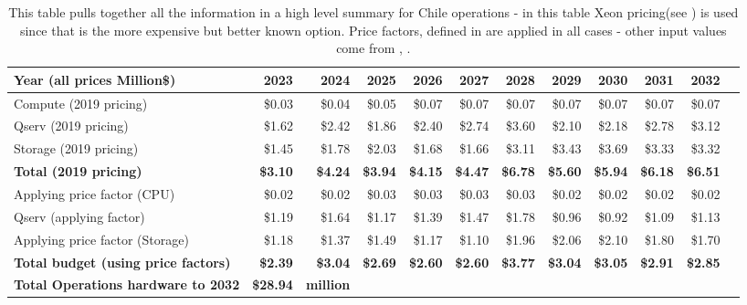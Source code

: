 \tiny \begin{longtable} { |p{}  |r  |r  |r  |r  |r  |r  |r  |r  |r  |r  |r |} 
\caption{This table pulls together all the information in a high level summary for Chile operations - in this table Xeon pricing(see ) is used since that is the more expensive but better known option. Price factors, defined in  are applied in all cases - other input values come from , .
 \label{tab:opsSumChile}}\\ 
\hline 
\textbf{Year  (all prices Million\$)}&\textbf{2023}&\textbf{2024}&\textbf{2025}&\textbf{2026}&\textbf{2027}&\textbf{2028}&\textbf{2029}&\textbf{2030}&\textbf{2031}&\textbf{2032} \\ \hline
{Compute (2019 pricing)}&{\$0.03}&{\$0.04}&{\$0.05}&{\$0.07}&{\$0.07}&{\$0.07}&{\$0.07}&{\$0.07}&{\$0.07}&{\$0.07} \\ \hline
{Qserv (2019 pricing)}&{\$1.62}&{\$2.42}&{\$1.86}&{\$2.40}&{\$2.74}&{\$3.60}&{\$2.10}&{\$2.18}&{\$2.78}&{\$3.12} \\ \hline
{Storage (2019 pricing)}&{\$1.45}&{\$1.78}&{\$2.03}&{\$1.68}&{\$1.66}&{\$3.11}&{\$3.43}&{\$3.69}&{\$3.33}&{\$3.32} \\ \hline
\textbf{Total (2019 pricing)}&\textbf{\$3.10}&\textbf{\$4.24}&\textbf{\$3.94}&\textbf{\$4.15}&\textbf{\$4.47}&\textbf{\$6.78}&\textbf{\$5.60}&\textbf{\$5.94}&\textbf{\$6.18}&\textbf{\$6.51} \\ \hline
{Applying price factor (CPU)}&{\$0.02}&{\$0.02}&{\$0.03}&{\$0.03}&{\$0.03}&{\$0.03}&{\$0.02}&{\$0.02}&{\$0.02}&{\$0.02} \\ \hline
{Qserv (applying factor)}&{\$1.19}&{\$1.64}&{\$1.17}&{\$1.39}&{\$1.47}&{\$1.78}&{\$0.96}&{\$0.92}&{\$1.09}&{\$1.13} \\ \hline
{Applying price factor (Storage)}&{\$1.18}&{\$1.37}&{\$1.49}&{\$1.17}&{\$1.10}&{\$1.96}&{\$2.06}&{\$2.10}&{\$1.80}&{\$1.70} \\ \hline
\textbf{Total budget (using price factors)}&\textbf{\$2.39}&\textbf{\$3.04}&\textbf{\$2.69}&\textbf{\$2.60}&\textbf{\$2.60}&\textbf{\$3.77}&\textbf{\$3.04}&\textbf{\$3.05}&\textbf{\$2.91}&\textbf{\$2.85} \\ \hline
\textbf{Total Operations hardware to 2032 }&\textbf{\$28.94}&\textbf{million}&&&&&&&& \\ \hline
\end{longtable} \normalsize
